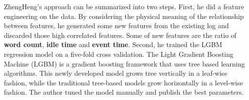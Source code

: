 \documentclass[8pt]{report}
\begin{document}
ZhengHeng's approach can be summarized into two steps. First, he did a feature engineering on the data. 
By considering the physical meaning of the relationship between features, he generated some new features from 
the existing log and discarded those high correlated features. Some of new features are the ratio of 
\textbf{word count}, \textbf{idle time} and \textbf{event time}. Second, he trained the LGBM regression model
on a five-fold cross validation. The Light Gradient Boosting Machine (LGBM) is a gradient boosting framework
that uses tree based learning algorithms. 
This newly developed model grows tree vertically in a leaf-wise fashion, while the traditional tree-based models
grow horizontally in a level-wise fashion. The author tuned the model manually and publish the best parameters. 
\end{document}
